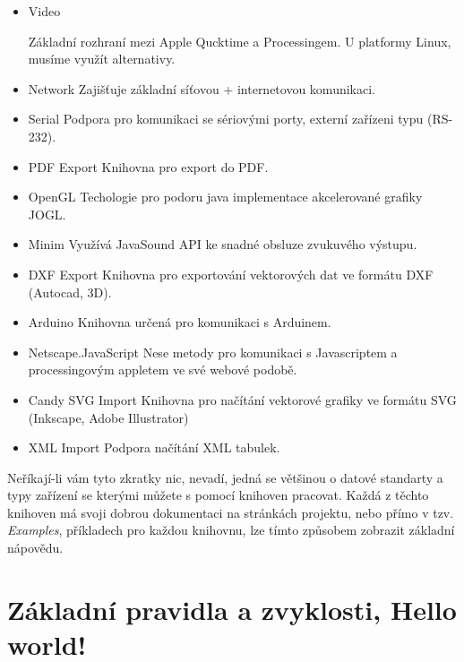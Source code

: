 \documentclass[11pt]{article}
\begin{document}
\begin{itemize}
\item
Video

Základní rozhraní mezi Apple Qucktime a Processingem. U platformy Linux, musíme využít alternativy.

\item
Network
Zajišťuje základní síťovou + internetovou komunikaci. 

\item
Serial
Podpora pro komunikaci se sériovými porty, externí zařízeni typu (RS-232).

\item
PDF Export
Knihovna pro export do PDF.

\item
OpenGL
Techologie pro podoru java implementace akcelerované grafiky JOGL.

\item
Minim
Využívá JavaSound API ke snadné obsluze zvukuvého výstupu.

\item
DXF Export
Knihovna pro exportování vektorových dat ve formátu DXF (Autocad, 3D).

\item
Arduino
Knihovna určená pro komunikaci s Arduinem.

\item
Netscape.JavaScript
Nese metody pro komunikaci s Javascriptem a processingovým appletem ve své webové podobě.

\item
Candy SVG Import
Knihovna pro načítání vektorové grafiky ve formátu SVG (Inkscape, Adobe Illustrator)

\item
XML Import
Podpora načítání XML tabulek.
\end{itemize}

Neříkají-li vám tyto zkratky nic, nevadí, jedná se většinou o datové standarty a typy zařízení se kterými můžete s pomocí knihoven pracovat. Každá z těchto knihoven má svoji dobrou dokumentaci na stránkách projektu, nebo přímo v tzv. {\em Examples}, příkladech pro každou knihovnu, lze tímto způsobem zobrazit základní nápovědu. 



\newpage
\section{Základní pravidla a zvyklosti, Hello world!}
\end{document}
